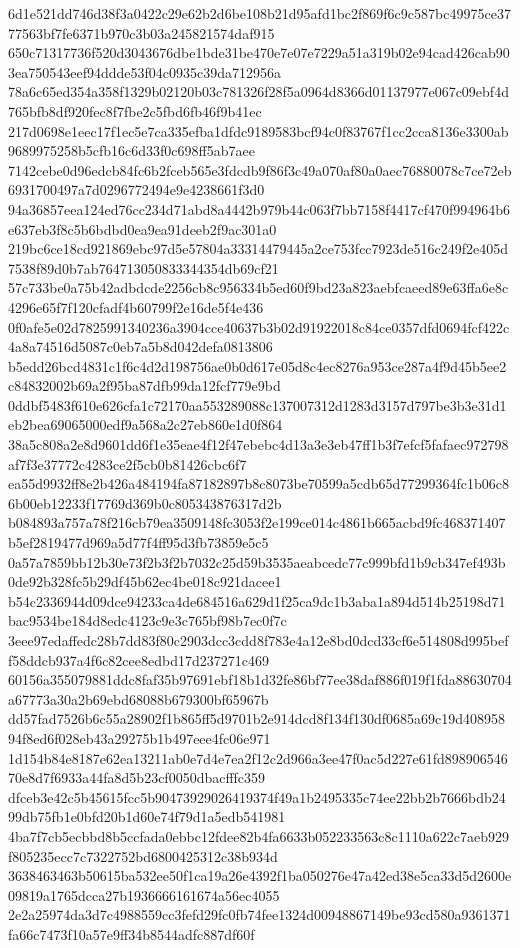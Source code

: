 \documentclass[11pt,a4paper]{article}
\begin{document}
{6d1e521dd746d38f3a0422c29e62b2d6be108b21d95afd1bc2f869f6c9c587bc49975ce3777563bf7fe6371b970c3b03a245821574daf915
650c71317736f520d3043676dbe1bde31be470e7e07e7229a51a319b02e94cad426cab903ea750543eef94ddde53f04c0935c39da712956a
78a6c65ed354a358f1329b02120b03c781326f28f5a0964d8366d01137977e067c09ebf4d765bfb8df920fec8f7fbe2c5fbd6fb46f9b41ec
217d0698e1eec17f1ec5e7ca335efba1dfdc9189583bcf94c0f83767f1cc2cca8136e3300ab9689975258b5cfb16c6d33f0c698ff5ab7aee
7142cebe0d96edcb84fc6b2fceb565e3fdcdb9f86f3c49a070af80a0aec76880078c7ce72eb6931700497a7d0296772494e9e4238661f3d0
94a36857eea124ed76cc234d71abd8a4442b979b44c063f7bb7158f4417cf470f994964b6e637eb3f8c5b6bdbd0ea9ea91deeb2f9ac301a0
219bc6ce18cd921869ebc97d5e57804a33314479445a2ce753fcc7923de516c249f2e405d7538f89d0b7ab764713050833344354db69cf21
57c733be0a75b42adbdcde2256cb8c956334b5ed60f9bd23a823aebfcaeed89e63ffa6e8c4296e65f7f120cfadf4b60799f2e16de5f4e436
0f0afe5e02d7825991340236a3904cce40637b3b02d91922018c84ce0357dfd0694fcf422c4a8a74516d5087c0eb7a5b8d042defa0813806
b5edd26bcd4831c1f6c4d2d198756ae0b0d617e05d8c4ec8276a953ce287a4f9d45b5ee2c84832002b69a2f95ba87dfb99da12fcf779e9bd
0ddbf5483f610e626cfa1c72170aa553289088c137007312d1283d3157d797be3b3e31d1eb2bea69065000edf9a568a2c27eb860e1d0f864
38a5c808a2e8d9601dd6f1e35eae4f12f47ebebc4d13a3e3eb47ff1b3f7efcf5fafaec972798af7f3e37772c4283ce2f5cb0b81426cbc6f7
ea55d9932ff8e2b426a484194fa87182897b8c8073be70599a5cdb65d77299364fc1b06c86b00eb12233f17769d369b0c805343876317d2b
b084893a757a78f216cb79ea3509148fc3053f2e199ce014c4861b665acbd9fc468371407b5ef2819477d969a5d77f4ff95d3fb73859e5c5
0a57a7859bb12b30e73f2b3f2b7032c25d59b3535aeabcedc77c999bfd1b9cb347ef493b0de92b328fc5b29df45b62ec4be018c921dacee1
b54c2336944d09dce94233ca4de684516a629d1f25ca9dc1b3aba1a894d514b25198d71bac9534be184d8edc4123c9e3c765bf98b7ec0f7c
3eee97edaffedc28b7dd83f80c2903dcc3cdd8f783e4a12e8bd0dcd33cf6e514808d995beff58ddcb937a4f6c82cee8edbd17d237271c469
60156a355079881ddc8faf35b97691ebf18b1d32fe86bf77ee38daf886f019f1fda88630704a67773a30a2b69ebd68088b679300bf65967b
dd57fad7526b6c55a28902f1b865ff5d9701b2e914dcd8f134f130df0685a69c19d40895894f8ed6f028eb43a29275b1b497eee4fc06e971
1d154b84e8187e62ea13211ab0e7d4e7ea2f12c2d966a3ee47f0ac5d227e61fd89890654670e8d7f6933a44fa8d5b23cf0050dbacfffc359
dfceb3e42c5b45615fcc5b90473929026419374f49a1b2495335c74ee22bb2b7666bdb2499db75fb1e0bfd20b1d60e74f79d1a5edb541981
4ba7f7cb5ecbbd8b5ccfada0ebbc12fdee82b4fa6633b052233563c8c1110a622c7aeb929f805235ecc7c7322752bd6800425312c38b934d
3638463463b50615ba532ee50f1ca19a26e4392f1ba050276e47a42ed38e5ca33d5d2600e09819a1765dcca27b1936666161674a56ec4055
2e2a25974da3d7c4988559cc3fefd29fc0fb74fee1324d00948867149be93cd580a9361371fa66c7473f10a57e9ff34b8544adfc887df60f
}
\end{document}
